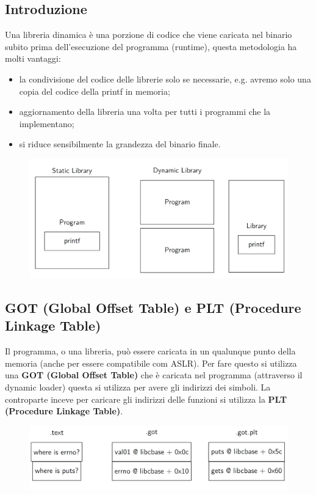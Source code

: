 \subsection{Introduzione}
Una libreria dinamica è una porzione di codice che viene caricata nel binario subito prima dell'esecuzione del programma (runtime), questa metodologia ha molti vantaggi:
\begin{itemize}
    \item la condivisione del codice delle librerie solo se necessarie, e.g. avremo solo una copia del codice della printf in memoria;
    \item aggiornamento della libreria una volta per tutti i programmi che la implementano;
    \item si riduce sensibilmente la grandezza del binario finale.
\end{itemize}

\begin{figure}[h!]
    \centering
    \includegraphics[width=.5\linewidth]{res/dynamic_libraries.png}
    \caption{}
\end{figure}

\subsection{GOT (Global Offset Table) e PLT (Procedure Linkage Table)}
Il programma, o una libreria, può essere caricata in un qualunque punto della memoria (anche per essere compatibile com ASLR).
Per fare questo si utilizza una \textbf{GOT (Global Offset Table)} che è caricata nel programma (attraverso il dynamic loader) questa si utilizza per avere gli indirizzi dei simboli.
La controparte inceve per caricare gli indirizzi delle funzioni si utilizza la \textbf{PLT (Procedure Linkage Table)}.

\begin{figure}[h!]
    \centering
    \includegraphics[width=.5\linewidth]{res/GOT_PLT.png}
    \caption{}
\end{figure}

